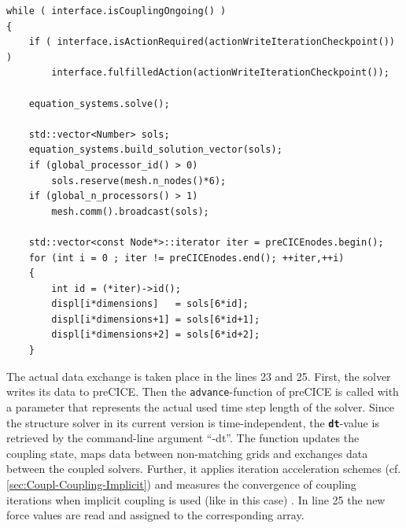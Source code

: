 \begin{lstlisting}[caption=preCICE main while-loop part 1,label=lst:preCICEint4a,keepspaces=true,name=while-loop]
while ( interface.isCouplingOngoing() )
{
	if ( interface.isActionRequired(actionWriteIterationCheckpoint()) )
		interface.fulfilledAction(actionWriteIterationCheckpoint());

	equation_systems.solve();

	std::vector<Number> sols;
	equation_systems.build_solution_vector(sols);
	if (global_processor_id() > 0)
		sols.reserve(mesh.n_nodes()*6);
	if (global_n_processors() > 1)
		mesh.comm().broadcast(sols);

	std::vector<const Node*>::iterator iter = preCICEnodes.begin();
	for (int i = 0 ; iter != preCICEnodes.end(); ++iter,++i)
	{
		int id = (*iter)->id();
		displ[i*dimensions]   = sols[6*id];
		displ[i*dimensions+1] = sols[6*id+1];
		displ[i*dimensions+2] = sols[6*id+2];
	}
\end{lstlisting}
   The actual data exchange is taken place in the lines 23 and 25. First, the solver writes its data to preCICE. Then the \texttt{advance}-function of preCICE is called with a parameter that represents the actual used time step length of the solver. Since the structure solver in its current version is time-independent, the \texttt{\textbf{dt}}-value is retrieved by the command-line argument ``-dt''. The function updates the coupling state, maps data between non-matching grids and exchanges data between the coupled solvers. Further, it applies iteration acceleration schemes (cf. \ref{sec:Coupl-Coupling-Implicit}) and measures the convergence of coupling iterations when implicit coupling is used (like in this case) \cite{gatzhammer2015efficient}. In line 25 the new force values are read and assigned to the corresponding array.

